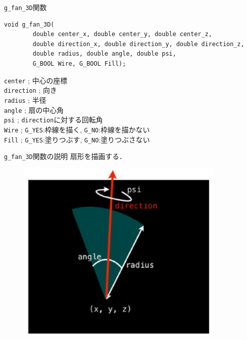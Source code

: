 \documentclass[platex,a4paper,12pt]{jsarticle}%
\begin{document}
\begin{itembox}[l]{\texttt{g\_fan\_3D}関数}
\begin{verbatim}
void g_fan_3D(
        double center_x, double center_y, double center_z,
        double direction_x, double direction_y, double direction_z,
        double radius, double angle, double psi,
        G_BOOL Wire, G_BOOL Fill);
\end{verbatim}
\verb|center| ; 中心の座標\\
\verb|direction| ; 向き\\
\verb|radius| ; 半径\\
\verb|angle| ; 扇の中心角\\
\verb|psi| ; \verb|direction|に対する回転角\\
\verb|Wire| ; \verb|G_YES|:枠線を描く, \verb|G_NO|:枠線を描かない \\
\verb|Fill| ; \verb|G_YES|:塗りつぶす, \verb|G_NO|:塗りつぶさない 
\end{itembox}

\begin{itembox}[l]{\texttt{g\_fan\_3D}関数の説明}
扇形を描画する．
\end{itembox}
\begin{figure}[htb]
	\includegraphics[width=100mm]{./Figures/eps/Canvas_g_fan.eps}
\end{figure}

\end{document}
